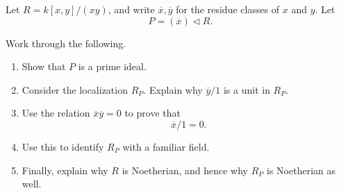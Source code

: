 \documentclass[11pt]{article}
\begin{document}
\begin{prob}
    Let $R = k[x,y]/(xy)$, and write 
    $\overline x, \overline y$ for the residue 
    classes of $x$ and $y$. 
    Let 
    \[
        P = (\overline x) \triangleleft R. 
    \]

    Work through the following. 

    \begin{enumerate}
        \item Show that $P$ is a prime ideal. 
        \item Consider the localization $R_P$. 
            Explain why $\overline y/1$ is a unit in $R_P$. 
        \item Use the relation $\overline x \overline y = 0$ 
            to prove that 
            \[
                \overline x/1 = 0. 
            \]
        \item Use this to identify $R_P$ with a familiar 
            field. 
        \item Finally, explain why $R$ is Noetherian, 
            and hence why $R_P$ is Noetherian as well.
    \end{enumerate}
\end{prob}
\end{document}
